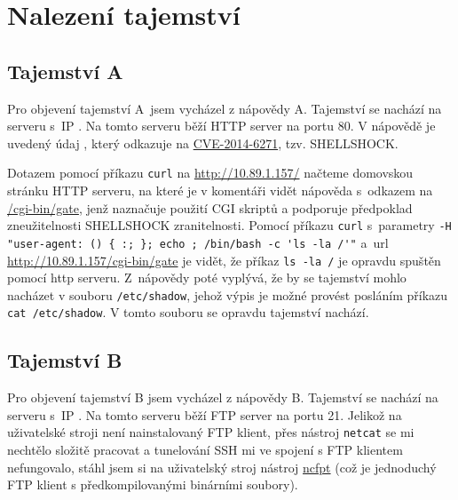 \documentclass[a4paper, 11pt]{article}
\begin{document}
\section{Nalezení tajemství}

\subsection{Tajemství A}
Pro objevení tajemství A~jsem vycházel z nápovědy A. Tajemství se nachází na serveru  s~IP . Na tomto serveru běží HTTP server na portu 80. V nápovědě je uvedený údaj , který odkazuje na \href{https://nvd.nist.gov/vuln/detail/cve-2014-6271}{CVE-2014-6271}, tzv. SHELLSHOCK.

Dotazem pomocí příkazu \texttt{curl} na \url{http://10.89.1.157/} načteme domovskou stránku HTTP serveru, na které je v komentáři vidět nápověda s~odkazem na \url{/cgi-bin/gate}, jenž naznačuje použití CGI skriptů a podporuje předpoklad zneužitelnosti SHELLSHOCK zranitelnosti. Pomocí příkazu \texttt{curl} s~parametry \verb|-H "user-agent: () { :; }; echo ; /bin/bash -c 'ls -la /'"| a~url \url{http://10.89.1.157/cgi-bin/gate} je vidět, že příkaz \verb|ls -la /| je opravdu spuštěn pomocí http serveru. Z~nápovědy poté vyplývá, že by se tajemství mohlo nacházet v souboru \verb|/etc/shadow|, jehož výpis je možné provést posláním příkazu \verb|cat /etc/shadow|. V tomto souboru se opravdu tajemství nachází.



\subsection{Tajemství B}
Pro objevení tajemství B jsem vycházel z nápovědy B. Tajemství se nachází na serveru  s~IP . Na tomto serveru běží FTP server na portu 21. Jelikož na uživatelské stroji není nainstalovaný FTP klient, přes nástroj \texttt{netcat} se mi nechtělo složitě pracovat a tunelování SSH mi ve spojení s FTP klientem nefungovalo, stáhl jsem si na uživatelský stroj nástroj \href{https://www.ncftp.com}{ncfpt} (což je jednoduchý FTP klient s předkompilovanými binárními soubory).
\end{document}
